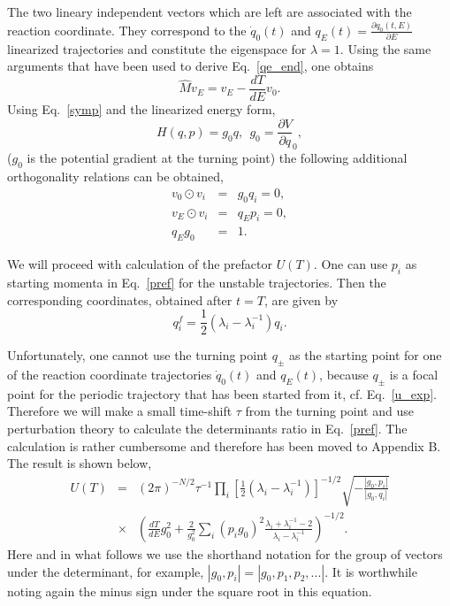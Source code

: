 \documentclass[journal=jpcafh,manuscript=article]{achemso}
\begin{document}
The two lineary independent vectors which are left are associated with
the reaction coordinate. They correspond to the $\dot{q}_0(t)$ and
$q_E(t)=\frac{\partial q_0(t, E)}{\partial E}$ linearized trajectories
and constitute the eigenspace for $\lambda = 1$. Using the same
arguments that have been used to derive Eq.~\ref{qe_end}, one 
obtains
\begin{equation}
  \label{qe_mon}
  \hat{M}v_E=v_E-\frac{dT}{dE}v_0.
\end{equation}
Using Eq.~\ref{symp} and the linearized energy form,
\begin{equation}
  \label{en_int}
  H(q, p) = g_0q,\ \ g_0=\frac{\partial V}{\partial q}_0,
\end{equation}
($g_0$ is the potential gradient at the turning point)
the following additional orthogonality relations can be
obtained,
\begin{eqnarray}
  \label{ort_rel1}
  v_0\odot v_i&=& g_0q_i=0,
  \\
  \label{ort_rel2}
  v_E\odot v_i&=&q_Ep_i = 0,
  \\
  \label{ort_rel3}
  q_Eg_0&=& 1.
\end{eqnarray}

We will proceed with calculation of the prefactor $U(T)$.  One can
use $p_i$ as starting momenta in Eq.~\ref{pref} for the unstable
trajectories.  Then the corresponding coordinates, obtained after
$t=T$, are given by
\begin{equation}
  \label{qf_exp}
q^f_i=\frac{1}{2}(\lambda_i - \lambda_i^{-1})q_i.
\end{equation}

Unfortunately, one cannot use the turning point $q_\pm$ as the starting
point 
for one of the reaction coordinate trajectories $\dot{q}_0(t)$ and
$q_E(t)$, because $q_\pm$ is a focal point for the periodic trajectory
that has been started from it, cf. Eq.~\ref{u_exp}. Therefore we will
make a small time-shift $\tau$ from the turning point and use 
perturbation theory to calculate the determinants ratio in
Eq.~\ref{pref}.  The calculation is rather cumbersome and therefore
has been moved to Appendix B. The result is shown below,
\begin{eqnarray}
  \label{u_exp1}
  U(T)&=& (2\pi)^{-N/2}\tau^{-1}
          \prod_i\left[\frac{1}{2}(\lambda_i-\lambda_i^{-1})\right]^{-1/2}\sqrt{-\frac{|g_0,p_i|}{|g_0,q_i|}}
  \\
  \nonumber
  &\times&\left(\frac{dT}{dE}g_0^2+\frac{2}{g_0^2}\sum_i (p_ig_0)^2
    \frac{\lambda_i+\lambda_i^{-1}-2}{\lambda_i-\lambda_i^{-1}}\right)^{-1/2}.
\end{eqnarray}
Here and in what follows we use the shorthand notation for the group of
vectors under the determinant, for example,
$|g_0,p_i|=|g_0,p_1,p_2,...|$.  It is worthwhile noting again the
minus sign under the square root in this equation.
\end{document}
